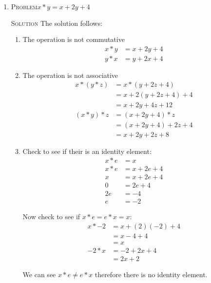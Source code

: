 \documentclass{amsart}
\newcommand{\Solution}{\textsc{Solution}\xspace}
\newcommand{\Problem}{\textsc{Problem}\xspace}
\begin{document}
\begin{enumerate}

   \item \Problem $x*y = x + 2y + 4$ 

   \noindent \Solution The solution follows:

   \begin{enumerate}
      \item The operation is not commutative
      \begin{align*}
         x * y & = x + 2y + 4 \\
	 y * x & = y + 2x + 4
      \end{align*}

      \item The operation is not associative
      \begin{align*}
         x * (y * z) & = x * (y + 2z + 4) \\
	             & = x + 2(y + 2z + 4) + 4 \\
		     & = x + 2y + 4z + 12  \\
         (x * y) * z & = (x + 2y + 4) * z \\
	             & = (x + 2y + 4) + 2z + 4 \\
		     & = x + 2y + 2z + 8
      \end{align*}

      \item Check to see if their is an identity element:
      \begin{align*}
         x * e & = x           \\ 
         x * e & = x + 2e + 4  \\
	     x & = x + 2e + 4  \\
	     0 & =     2e + 4  \\
	    2e & =         -4  \\
	     e & =         -2  
      \end{align*}

      Now check to see if $x*e=e*x=x$:
      \begin{align*}
         x * -2 & = x + (2)(-2) + 4 \\
	        & = x - 4 + 4       \\
		& = x               \\
	 -2 * x & = -2 + 2x + 4     \\
	        & = 2x + 2          
      \end{align*}

      We can see $x*e \ne e*x$ therefore there is no identity element.


\end{enumerate}
\end{enumerate}
\end{document}
